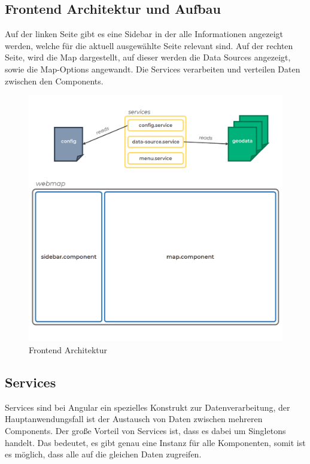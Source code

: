 \subsection{Frontend Architektur und Aufbau}
Auf der linken Seite gibt es eine Sidebar in der alle Informationen angezeigt werden, welche für die aktuell ausgewählte Seite relevant sind.
Auf der rechten Seite, wird die Map dargestellt, auf dieser werden die Data Sources angezeigt, sowie die Map-Options angewandt.
Die Services verarbeiten und verteilen Daten zwischen den Components.

\begin{figure}[hbt!]
    \centering
    \includegraphics[scale=.6]{pics/frontend-architecture}
    \caption{Frontend Architektur}
    \label{fig:frontend-architecture}
\end{figure}

\cleardoublepage

\subsection{Services}
Services sind bei Angular ein spezielles Konstrukt zur Datenverarbeitung, der Hauptanwendungsfall ist der Austausch von Daten
zwischen mehreren Components.
Der große Vorteil von Services ist, dass es dabei um Singletons handelt.
Das bedeutet, es gibt genau eine Instanz für alle Komponenten, somit ist es möglich, dass alle auf die gleichen Daten zugreifen.

